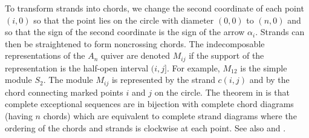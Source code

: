 \documentclass[11pt]{amsart}
\theoremstyle{definition}
\theoremstyle{remark}
\numberwithin{equation}{section}
\begin{document}
To transform strands into chords, we change the second coordinate of each point $(i,0)$ so that the point lies on the circle with diameter $(0,0)$ to $(n,0)$ and so that the sign of the second coordinate is the sign of the arrow $\alpha_i$. Strands can then be straightened to form noncrossing chords. The indecomposable representations of the $A_n$ quiver are denoted $M_{ij}$ if the support of the representation is the half-open interval $(i,j]$. For example, $M_{12}$ is the simple module $S_2$. The module $M_{ij}$ is represented by the strand $c(i,j)$ and by the chord connecting marked points $i$ and $j$ on the circle. The theorem in \cite{GIMO} is that complete exceptional sequences are in bijection with complete chord diagrams (having $n$ chords) which are equivalent to complete strand diagrams where the ordering of the chords and strands is clockwise at each point. See also \cite{BGMS} and \cite[Fig 4]{AI}.
\end{document}
